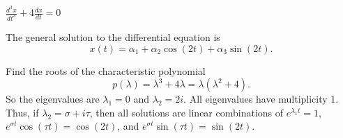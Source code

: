 \documentclass{ximera}
\begin{document}
\begin{exercise} \label{c12.2.5}
$\frac{d^3x}{dt^3}+4\frac{dx}{dt} = 0$

\begin{solution}
\ans The general solution to the differential equation is
\[
x(t) = \alpha_1 + \alpha_2\cos(2t) + \alpha_3\sin(2t).
\]

\soln Find the roots of the characteristic polynomial
\[
p(\lambda) = \lambda^3 + 4\lambda = \lambda(\lambda^2 + 4).
\]
So the eigenvalues are $\lambda_1 = 0$ and $\lambda_2 = 2i$.  All
eigenvalues have multiplicity 1.  Thus, if $\lambda_2 = \sigma + i\tau$, then
all solutions are linear combinations of $e^{\lambda_1 t} = 1$,
$e^{\sigma t}\cos(\tau t) = \cos(2t)$, and $e^{\sigma t}\sin(\tau t)
= \sin(2t)$.

\end{solution}
\end{exercise}
\end{document}
